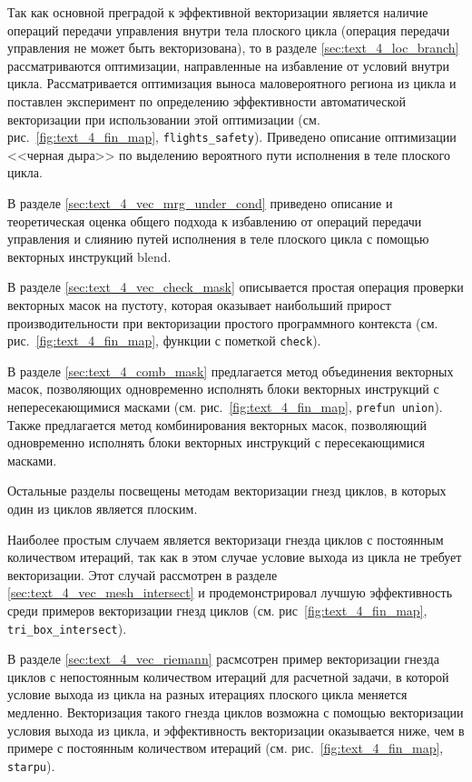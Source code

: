 Так как основной преградой к эффективной векторизации является наличие операций передачи управления внутри тела плоского цикла (операция передачи управления не может быть векторизована), то в разделе \ref{sec:text_4_loc_branch} рассматриваются оптимизации, направленные на избавление от условий внутри цикла.
Рассматривается оптимизация выноса маловероятного региона из цикла\label{term:meth_vec_del_low_prob_regions3} и поставлен эксперимент по определению эффективности автоматической векторизации при использовании этой оптимизации (см. рис.~\ref{fig:text_4_fin_map}, \texttt{flights\_safety}).
Приведено описание оптимизации <<черная дыра>>\label{term:blackhome_optimization2} по выделению вероятного пути исполнения в теле плоского цикла.

В разделе \ref{sec:text_4_vec_mrg_under_cond} приведено описание и теоретическая оценка общего подхода к избавлению от операций передачи управления и слиянию путей исполнения\label{term:meth_vec_merge4} в теле плоского цикла с помощью векторных инструкций blend.

В разделе \ref{sec:text_4_vec_check_mask} описывается простая операция проверки векторных масок на пустоту\label{term:meth_vec_check4}, которая оказывает наибольший прирост производительности при векторизации простого программного контекста (см. рис.~\ref{fig:text_4_fin_map}, функции с пометкой \texttt{check}).

В разделе \ref{sec:text_4_comb_mask} предлагается метод объединения векторных масок\label{term:meth_vec_union3}, позволяющих одновременно исполнять блоки векторных инструкций с непересекающимися масками (см. рис.~\ref{fig:text_4_fin_map}, \texttt{prefun union}).
Также предлагается метод комбинирования векторных масок\label{term:meth_vec_comb2}, позволяющий одновременно исполнять блоки векторных инструкций с пересекающимися масками.

Остальные разделы посвещены методам векторизации гнезд циклов, в которых один из циклов является плоским.

Наиболее простым случаем является векторизаци гнезда циклов с постоянным количеством итераций, так как в этом случае условие выхода из цикла не требует векторизации.
Этот случай рассмотрен в разделе \ref{sec:text_4_vec_mesh_intersect} и продемонстрировал лучшую эффективность среди примеров векторизации гнезд циклов (см. рис~\ref{fig:text_4_fin_map}, \texttt{tri\_box\_intersect}).

В разделе \ref{sec:text_4_vec_riemann} расмсотрен пример векторизации гнезда циклов с непостоянным количеством итераций для расчетной задачи, в которой условие выхода из цикла на разных итерациях плоского цикла меняется медленно.
Векторизация такого гнезда циклов возможна с помощью векторизации условия выхода из цикла, и эффективность векторизации оказывается ниже, чем в примере с постоянным количеством итераций (см. рис.~\ref{fig:text_4_fin_map}, \texttt{starpu}).

